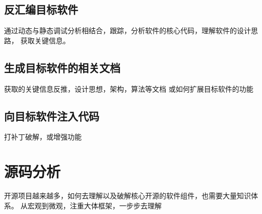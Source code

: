 \subsection{反汇编目标软件}
通过动态与静态调试分析相结合，跟踪，分析软件的核心代码，理解软件的设计思路，
获取关键信息。

\subsection{生成目标软件的相关文档}
获取的关键信息反推，设计思想，架构，算法等文档
或如何扩展目标软件的功能

\subsection{向目标软件注入代码}
打补丁破解，或增强功能


\section{源码分析}
开源项目越来越多，如何去理解以及破解核心开源的软件组件，也需要大量知识体系。
从宏观到微观，注重大体框架，一步步去理解
